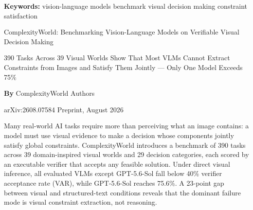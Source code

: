 \documentclass[10pt,twocolumn]{article}
\begin{document}
\setlength{\parindent}{0pt}
\setlength{\parskip}{4pt}

{\small\color{keywordgray}\textbf{Keywords:}
  vision-language models \textbullet{}
  benchmark \textbullet{}
  visual decision making \textbullet{}
  constraint satisfaction}\par\vspace{4pt}

{\LARGE\bfseries\raggedright
  ComplexityWorld: Benchmarking Vision-Language
  Models on Verifiable Visual Decision
  Making}\par\vspace{4pt}

{\large\itshape\raggedright
  390 Tasks Across 39 Visual Worlds Show That Most VLMs Cannot
  Extract Constraints from Images and Satisfy Them Jointly ---
  Only One Model Exceeds 75\%}\par\vspace{6pt}

{\small\textbf{By} ComplexityWorld Authors}\par\vspace{2pt}

{\small\color{keywordgray}arXiv:2608.07584 \textbullet{} Preprint, August 2026}
\par\vspace{2pt}\noindent{\color{rulered}\rule{\columnwidth}{0.6pt}}\vspace{6pt}

Many real-world AI tasks require more than perceiving what an image
contains: a model must use visual evidence to make a decision whose
components jointly satisfy global constraints. ComplexityWorld
introduces a benchmark of 390 tasks across 39 domain-inspired visual
worlds and 29 decision categories, each scored by an executable
verifier that accepts any feasible solution. Under direct visual
inference, all evaluated VLMs except GPT-5.6-Sol fall below 40\%
verifier acceptance rate (VAR), while GPT-5.6-Sol reaches 75.6\%.
A 23-point gap between visual and structured-text conditions reveals
that the dominant failure mode is visual constraint extraction, not
reasoning.
\end{document}

